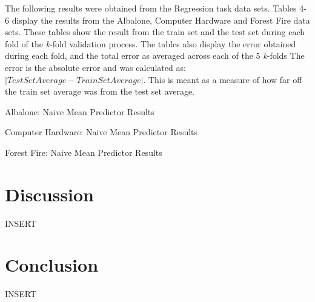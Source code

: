 \documentclass[twoside,11pt]{article}
\begin{document}
The following results were obtained from the Regression task data sets. Tables 4-6 display the results from the Albalone, Computer Hardware and Forest Fire data sets. These tables show the result from the train set and the test set during each fold of the \textit{k}-fold validation process.  The tables also display the error obtained during each fold, and the total error as averaged across each of the 5 \textit{k}-folds The error is the absolute error and was calculated as: $| Test Set Average - Train Set Average|$. This is meant as a measure of how far off the train set average was from the test set average. 

\begin{table}[h!]
	\begin{center}
		\caption{Albalone: Naive Mean Predictor Results}
		\label{tab:table4}
	\end{center}
\end{table}

\begin{table}[h!]
	\begin{center}
		\caption{Computer Hardware: Naive Mean Predictor Results}
		\label{tab:table5}
	\end{center}
\end{table}

\begin{table}[h!]
	\begin{center}
		\caption{Forest Fire: Naive Mean Predictor Results}
		\label{tab:table6}
	\end{center}
\end{table}



\newpage

\section{Discussion}
INSERT\\ 

\section{Conclusion}
INSERT\\ 

\newpage
\end{document}
